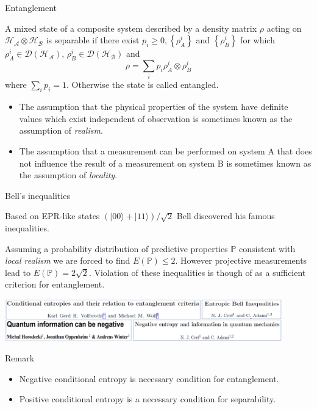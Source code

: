 \documentclass{beamer}
\begin{document}
\begin{frame}{Entanglement}
\begin{small}
\begin{definition}
A mixed state of a composite system described by a density matrix $\rho$ acting on $\mathcal{H_{A}} \otimes \mathcal{H_{B}}$ is separable if there exist $p_{i} \geq 0,\left\{\rho_{A}^{i}\right\}$ and $\left\{\rho_{B}^{i}\right\}$ for which $\rho^{i}_A \in \mathcal{D}(\mathcal{H_A})$, $\rho^{i}_B \in \mathcal{D}(\mathcal{H_B})$
and
$$
\rho=\sum_{i} p_{i} \rho_{A}^{i} \otimes \rho_{B}^{i}
$$
where $\sum_{i} p_{i}=1$. Otherwise the state is called entangled.
\end{definition} 
\end{small}
\begin{small}
\begin{itemize}
\item The assumption that the physical properties of the system have definite values which exist independent of observation is sometimes known as the assumption of \textit{realism}. 
\item The assumption that a measurement can be performed on system A that does not influence the result of a measurement on system B is sometimes known as the assumption of \textit{locality}.
\end{itemize}
\end{small}
\end{frame}
\begin{frame}{Bell's inequalities}
\begin{scriptsize}
Based on EPR-like states $(|00\rangle+|11\rangle)/\sqrt{2}$ Bell discovered his famous inequalities.
\begin{center}	
\end{center}
Assuming a probability distribution of predictive properties $\mathbb{P}$ consistent with \textit{local realism}  we are forced to find $E(\mathbb{P})\leq 2$. However projective measurements lead to $E(\mathbb{P})=2 \sqrt{2}$. Violation of these inequalities is though of as a sufficient criterion for entanglement.
\begin{center}	\includegraphics[width=0.9\textwidth]{figures/paperfig8}
\end{center}
\begin{alertblock}{Remark}
\begin{itemize}
\item Negative conditional entropy is necessary condition for entanglement.
\item Positive conditional entropy is a necessary condition for separability.
\end{itemize}
\end{alertblock}
\end{scriptsize}
\end{frame}
\end{document}
